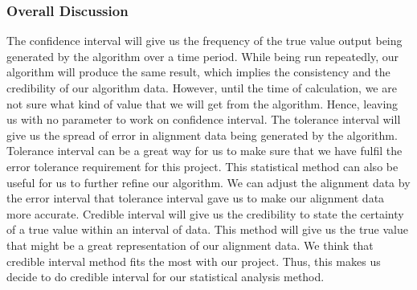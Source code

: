 \hfill \break
\subsubsection{Overall Discussion}
The confidence interval will give us the frequency of the true value output being generated by the algorithm over a time period. While being run repeatedly, our algorithm will produce the same result, which implies the consistency and the credibility of our algorithm data. However, until the time of calculation, we are not sure what kind of value that we will get from the algorithm. Hence, leaving us with no parameter to work on confidence interval. The tolerance interval will give us the spread of error in alignment data being generated by the algorithm. Tolerance interval can be a great way for us to make sure that we have fulfil the error tolerance requirement for this project. This statistical method can also be useful for us to further refine our algorithm. We can adjust the alignment data by the error interval that tolerance interval gave us to make our alignment data more accurate. Credible interval will give us the credibility to state the certainty of a true value within an interval of data. This method will give us the true value that might be a great representation of our alignment data. We think that credible interval method fits the most with our project. Thus, this makes us decide to do credible interval for our statistical analysis method. 


















